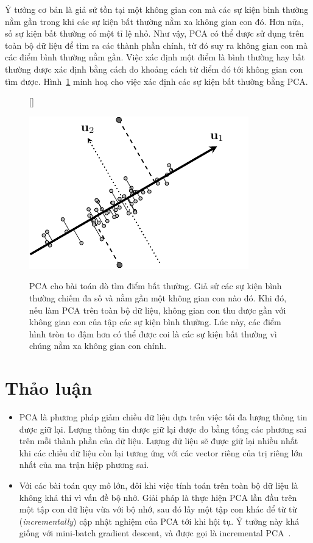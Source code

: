 Ý tưởng cơ bản là giả sử tồn tại một không gian con mà các sự kiện bình thường
nằm gần trong khi các sự kiện bất thường nằm xa không gian con đó. Hơn nữa, số
sự kiện bất thường có một tỉ lệ nhỏ. Như vậy, PCA có thể được sử dụng trên toàn
bộ dữ liệu để tìm ra các thành phần chính, từ đó suy ra không gian con mà các điểm bình thường nằm gần.
Việc xác định một điểm là bình thường hay bất thường được xác định bằng cách đo
khoảng cách từ điểm đó tới không gian con tìm được. Hình~\ref{fig:28_4} minh hoạ
cho việc xác định các sự kiện bất thường bằng PCA.

\begin{figure}[t]

    [\FBwidth]
    {\caption{ PCA cho bài toán dò tìm điểm bất thường. Giả sử
    các sự kiện {bình thường} chiếm đa số và nằm gần  một không
    gian con nào đó. Khi đó, nếu làm PCA trên toàn bộ dữ liệu, không gian con
    thu được gần với không gian con của tập các sự kiện {bình thường}.
    Lúc này, các
    điểm hình tròn to đậm hơn có thể được coi là các sự kiện {bất thường} vì chúng nằm xa không gian con chính.}
    \label{fig:28_4}}
    { %
    \includegraphics[width=.45\textwidth]{Chapters/07_DimemsionalityReduction/28_pca2/latex/abnormal.pdf}
    }
\end{figure}


\section{Thảo luận}
\begin{itemize}
    \item PCA là phương pháp giảm chiều dữ liệu dựa trên việc tối đa lượng
          thông tin được giữ lại. Lượng thông tin được giữ lại được đo bằng tổng các
          phương sai trên mỗi thành phần của dữ liệu. Lượng dữ liệu sẽ được giữ lại nhiều
          nhất khi các chiều dữ liệu còn lại tương ứng với các vector riêng của trị riêng
          lớn nhất của ma trận hiệp phương sai.

    \item Với các bài toán quy mô lớn, đôi khi việc tính toán trên toàn bộ dữ liệu
          là không khả thi vì vấn đề bộ nhớ. Giải pháp là thực hiện PCA lần đầu
          trên một tập con dữ liệu vừa với bộ nhớ, sau đó lấy một tập con khác để {từ từ} (\textit{incrementally}) cập nhật nghiệm của PCA tới khi hội
          tụ. Ý tưởng này khá giống với mini-batch gradient descent, và được gọi là
          incremental PCA~\cite{zhao2006novel}.


\end{itemize}

